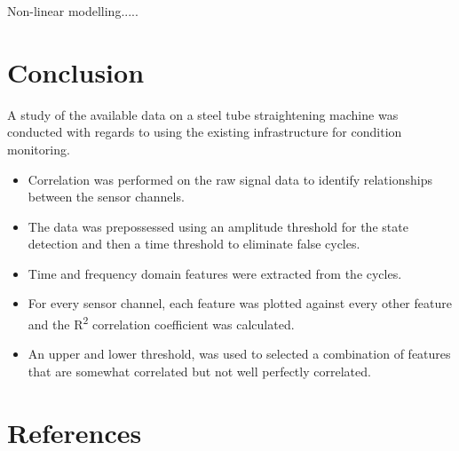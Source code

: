 \documentclass[]{article}
\begin{document}
Non-linear modelling.....
\clearpage

\section{Conclusion}
A study of the available data on a steel tube straightening machine was conducted with regards to using the existing infrastructure for condition monitoring.
\begin{itemize}
\item Correlation was performed on the raw signal data to identify relationships between the sensor channels.
\item The data was prepossessed using an amplitude threshold for the state detection and then a time threshold to eliminate false cycles.
\item Time and frequency domain features were extracted from the cycles.
\item For every sensor channel, each feature was plotted against every other feature and the R\textsuperscript{2} correlation coefficient was calculated.
\item An upper and lower threshold, was used to selected a combination of features that are somewhat correlated but not well perfectly correlated.
\end{itemize}
\newpage

\section{References} 
\printbibliography[heading=none] 
\clearpage  
\end{document}
